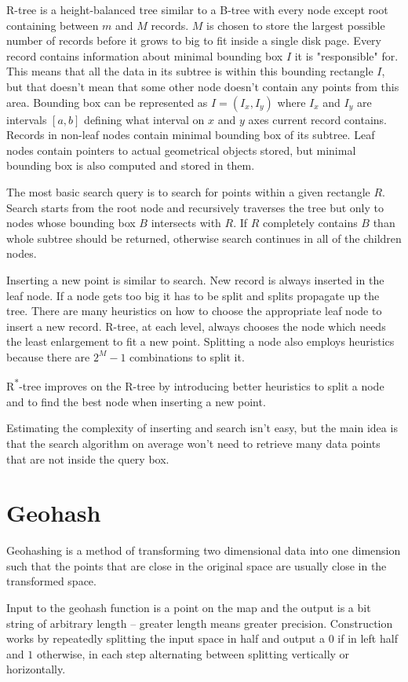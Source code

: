 \documentclass[times, utf8, diplomski]{fer}
\newcommand{\rstar}{R\textsuperscript{*}}
\begin{document}
R-tree is a height-balanced tree similar to a B-tree with every node except root containing between $m$ and $M$ records. $M$ is chosen to store the largest possible number of records before it grows to big to fit inside a single disk page. Every record contains information about minimal bounding box $I$ it is "responsible" for. This means that all the data in its subtree is within this bounding rectangle $I$, but that doesn't mean that some other node doesn't contain any points from this area. Bounding box can be represented as $I = (I_x, I_y)$ where $I_x$ and $I_y$ are intervals $[a, b]$ defining what interval on $x$ and $y$ axes current record contains. Records in non-leaf nodes contain minimal bounding box of its subtree. Leaf nodes contain pointers to actual geometrical objects stored, but minimal bounding box is also computed and stored in them.

The most basic search query is to search for points within a given rectangle $R$. Search starts from the root node and recursively traverses the tree but only to nodes whose bounding box $B$ intersects with $R$. If $R$ completely contains $B$ than whole subtree should be returned, otherwise search continues in all of the children nodes.

Inserting a new point is similar to search. New record is always inserted in the leaf node. If a node gets too big it has to be split and splits propagate up the tree. There are many heuristics on how to choose the appropriate leaf node to insert a new record. R-tree, at each level, always chooses the node which needs the least enlargement to fit a new point. Splitting a node also employs heuristics because there are $2^M-1$ combinations to split it.

\rstar-tree improves on the R-tree by introducing better heuristics to split a node and to find the best node when inserting a new point.

Estimating the complexity of inserting and search isn't easy, but the main idea is that the search algorithm on average won't need to retrieve many data points that are not inside the query box.

\section{Geohash}
Geohashing is a method of transforming two dimensional data into one dimension such that the points that are close in the original space are usually close in the transformed space.

Input to the geohash function is a point on the map and the output is a bit string of arbitrary length -- greater length means greater precision. Construction works by repeatedly splitting the input space in half and output a $0$ if in left half and $1$ otherwise, in each step alternating between splitting vertically or horizontally.
\end{document}
